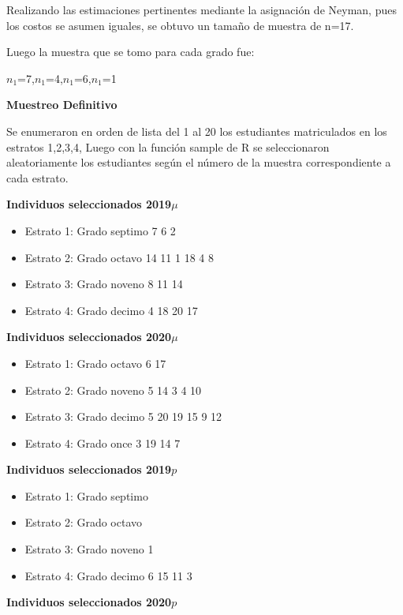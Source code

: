\documentclass[
]{article}
\providecommand{\tightlist}{%
  \setlength{\itemsep}{0pt}\setlength{\parskip}{0pt}}
\begin{document}
Realizando las estimaciones pertinentes mediante la asignación de
Neyman, pues los costos se asumen iguales, se obtuvo un tamaño de
muestra de n=17.

Luego la muestra que se tomo para cada grado fue:

\(n_1\)=7,\(n_1\)=4,\(n_1\)=6,\(n_1\)=1

\newpage
\begin{center}
\textbf{Muestreo Definitivo}
\end{center}

Se enumeraron en orden de lista del 1 al 20 los estudiantes matriculados
en los estratos 1,2,3,4, Luego con la función sample de R se
seleccionaron aleatoriamente los estudiantes según el número de la
muestra correspondiente a cada estrato.

\textbf{Individuos seleccionados 2019}\(\mu\)

\begin{itemize}
\tightlist
\item
  Estrato 1: Grado septimo 7 6 2
\item
  Estrato 2: Grado octavo 14 11 1 18 4 8
\item
  Estrato 3: Grado noveno 8 11 14
\item
  Estrato 4: Grado decimo 4 18 20 17
\end{itemize}

\textbf{Individuos seleccionados 2020}\(\mu\)

\begin{itemize}
\tightlist
\item
  Estrato 1: Grado octavo 6 17
\item
  Estrato 2: Grado noveno 5 14 3 4 10
\item
  Estrato 3: Grado decimo 5 20 19 15 9 12
\item
  Estrato 4: Grado once 3 19 14 7
\end{itemize}

\textbf{Individuos seleccionados 2019}\(p\)

\begin{itemize}
\tightlist
\item
  Estrato 1: Grado septimo
\item
  Estrato 2: Grado octavo
\item
  Estrato 3: Grado noveno 1
\item
  Estrato 4: Grado decimo 6 15 11 3
\end{itemize}

\textbf{Individuos seleccionados 2020}\(p\)
\end{document}
